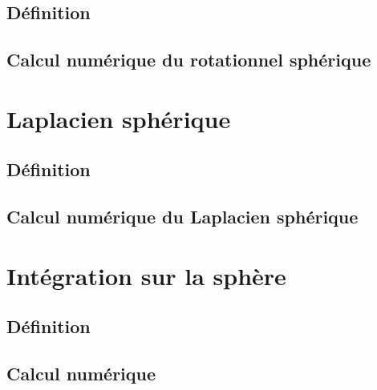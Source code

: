 \subsection{Définition}

\subsection{Calcul numérique du rotationnel sphérique}

\section{Laplacien sphérique}

\subsection{Définition}

\subsection{Calcul numérique du Laplacien sphérique}

\section{Intégration sur la sphère}

\subsection{Définition}

\subsection{Calcul numérique}